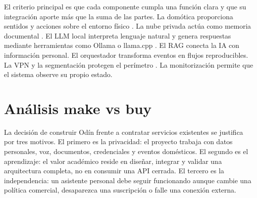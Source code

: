 El criterio principal es que cada componente cumpla una función clara y que su integración aporte más que la suma de las partes. La domótica proporciona sentidos y acciones sobre el entorno físico \cite{homeAssistantDocs}. La nube privada actúa como memoria documental \cite{nextcloudDocs}. El LLM local interpreta lenguaje natural y genera respuestas mediante herramientas como Ollama o llama.cpp \cite{ollamaDocs,llamacppRepo}. El RAG conecta la IA con información personal. El orquestador transforma eventos en flujos reproducibles. La VPN y la segmentación protegen el perímetro \cite{wireguardWhitepaper}. La monitorización permite que el sistema observe su propio estado.

\section{Análisis make vs buy}
La decisión de construir Odín frente a contratar servicios existentes se justifica por tres motivos. El primero es la privacidad: el proyecto trabaja con datos personales, voz, documentos, credenciales y eventos domésticos. El segundo es el aprendizaje: el valor académico reside en diseñar, integrar y validar una arquitectura completa, no en consumir una API cerrada. El tercero es la independencia: un asistente personal debe seguir funcionando aunque cambie una política comercial, desaparezca una suscripción o falle una conexión externa.
